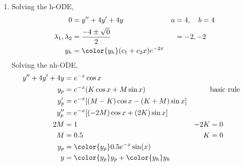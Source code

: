 \begin{enumerate}
    \item Solving the h-ODE,
          \begin{align}
              0                        & = y'' + 4y' + 4y                      &
              a                        & = 4, \quad b = 4                        \\
              \lambda_{1}, \lambda_{2} & = \frac{-4 \pm \sqrt{0}}{2}           &
                                       & = -2, -2                                \\
              y_{h}                    & = \color{y_h} (c_{1} + c_{2}x)e^{-2x}
          \end{align}
          Solving the nh-ODE,
          \begin{align}
              y'' + 4y' + 4y & = e^{-x}\cos x                                \\
              y_{p}          & = e^{-x}(K \cos x + M \sin x)               &
                             & \text{basic rule}                             \\
              y_{p}'         & = e^{-x}[ (M-K)\cos x - (K+M)\sin x ]         \\
              y_{p}''        & = e^{-x}[(-2M)\cos x + (2K)\sin x]            \\
              2M             & = 1                                         &
              -2K            & = 0                                           \\
              M              & = 0.5                                       &
              K              & = 0                                           \\
              y_{p}          & = \color{y_p} 0.5e^{-x}\sin(x)                \\
              y              & = {\color{y_p} y_{p}} + {\color{y_h} y_{h}}
          \end{align}


\end{enumerate}
